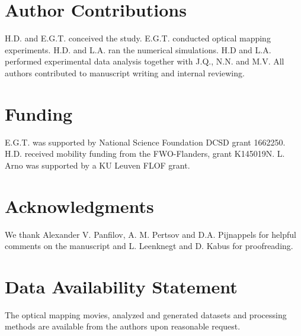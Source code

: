 \documentclass{article}
\begin{document}
\section*{Author Contributions}

H.D. and E.G.T. conceived the study. E.G.T. conducted optical mapping experiments. H.D. and L.A. ran the numerical simulations. H.D and L.A. performed experimental data analysis together with J.Q., N.N. and M.V. All authors contributed to manuscript writing and internal reviewing. 

\section*{Funding}
E.G.T. was supported by National Science Foundation DCSD grant 1662250. H.D. received mobility funding from the FWO-Flanders, grant K145019N. L. Arno was supported by a KU Leuven FLOF grant.

\section*{Acknowledgments}
We thank Alexander V. Panfilov, A. M. Pertsov and D.A. Pijnappels for helpful comments on the manuscript and L. Leenknegt and D. Kabus for proofreading. 

\section*{Data Availability Statement}
The optical mapping movies, analyzed and generated datasets and processing methods are available from the authors upon reasonable request.

\clearpage


%
%





\end{document}

